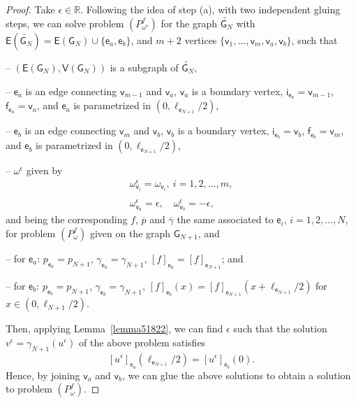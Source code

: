 \documentclass[reqno,12pt]{amsart}
\def\e{\mathsf{e}} 	%
\def\v{\mathsf{v}}	%
\newcommand{\vi}{\mathsf{i}} %
\newcommand{\vf}{\mathsf{f}} %
\newcommand{\G}{\mathsf{G}}	%
\newcommand{\V}{\mathsf{V}}	%
\newcommand{\E}{\mathsf{E}}	%
\numberwithin{equation}{section} %
\begin{document}
\begin{proof}
Take $\epsilon\in \mathbb{R}$. Following the idea  of step (a),  with two independent  gluing steps, we can solve problem $(P_{\omega^\epsilon}^f)$ for the graph $\widetilde{\G_N}$ with $\E(\widetilde{\G_N}) = \E(\G_{N})\cup \{\e_a,\e_b\}$, and $m+2$ vertices $\{\v_1, \ldots, \v_{m},\v_a,\v_b\}$, such that

-- $(\E(\G_N),\V(\G_{N}))$ is a subgraph of $\widetilde{\G_N}$,

-- $\e_a$ is an edge connecting $\v_{m-1}$ and $\v_a$, $\v_a$ is a boundary vertex, $\vi_{\e_a}=\v_{m-1}$, $\vf_{\e_a}=\v_a$, and $\e_a$ is parametrized in   $(0,\ell_{\e_{N+1}}/2)$, 

-- $\e_b$ is an edge connecting $\v_{m}$ and $\v_b$, $\v_b$ is a boundary vertex, $\vi_{\e_b}=\v_b$, $\vf_{\e_b}=\v_{m}$, and $\e_b$ is parametrized in $(0,\ell_{\e_{N+1}}/2)$,

-- $\omega^{\epsilon}$ given by 
$$\begin{array}{c}\displaystyle\omega^\epsilon_{\v_i}=\omega_{\v_i},\ i=1,2,...,m,\\ \\
\displaystyle\omega^\epsilon_{\v_a}=\epsilon, \quad 
\omega^\epsilon_{\v_b}=-\epsilon,
\end{array}$$
and being the corresponding $f$, $\overline{p}$ and $\overline{\gamma}$ the same associated to $\e_i$, $i=1,2,...,N$, for problem $(P_\omega^f)$ given on the graph $\G_{N+1}$, and 

-- for $\e_a$: $p_{\e_a}=p_{N+1}$, $\gamma_{\e_a}=\gamma_{N+1}$, $[f]_{\e_a}= [f]_{\e_{N+1}}$; and 

-- for $\e_b$: $p_{\e_b}=p_{N+1}$, $\gamma_{\e_b}=\gamma_{N+1}$, $[f]_{\e_b}(x)= [f]_{\e_{N+1}}(x+\ell_{\e_{N+1}}/2)$ for $x\in (0,\ell_{N+1}/2)$.

Then, applying Lemma~\ref{lemma51822}, we can find $\epsilon$ such that  the  solution $v^\epsilon=\gamma_{N+1}(u^\epsilon)$ of the above problem satisfies $$[u^\epsilon]_{\e_a}(\ell_{\e_{N+1}}/2)=[u^\epsilon]_{\e_b}(0).$$
Hence, by joining $\v_a$ and $\v_b$, we can glue the above solutions to obtain a solution to problem $(P_\omega^f)$.
\end{proof}

 
\end{document}
